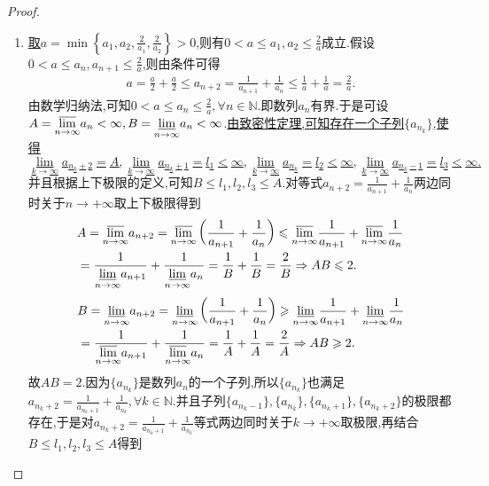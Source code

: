 \documentclass[../../main.tex]{subfiles}%
\begin{document}
\begin{proof}
\begin{enumerate}
\item \hyperref[example3.24(1)]{取\(a=\min \left\{ a_1,a_2,\frac{2}{a_1},\frac{2}{a_2} \right\}>0\)},则有$0<a\leqslant  a_1,a_2\leqslant  \frac{2}{a}$成立.假设$0<a\leqslant  a_n,a_{n+1}\leqslant  \frac{2}{a}$,则由条件可得
\begin{align*}
a=\frac{a}{2}+\frac{a}{2}\leqslant a_{n+2}=\frac{1}{a_{n+1}}+\frac{1}{a_n}\leqslant \frac{1}{a}+\frac{1}{a}=\frac{2}{a}.
\end{align*}
由数学归纳法,可知$0<a\leqslant  a_n\leqslant  \frac{2}{a},\forall n\in\mathbb{N}$.即数列${a_n}$有界.于是可设$A=\underset{n\rightarrow \infty}{{\varlimsup }}a_n<\infty ,B=\underset{n\rightarrow \infty}{{\varliminf }}a_n<\infty$.\hyperref[example3.24(2)]{由致密性定理,可知存在一个子列$\{a_{n_k}\}$,使得$$\lim_{k\rightarrow \infty} a_{n_k+2}=A,\lim_{k\rightarrow \infty} a_{n_k+1}=l_1<\infty,\lim_{k\rightarrow \infty} a_{n_k}=l_2<\infty,\lim_{k\rightarrow \infty} a_{n_k-1}=l_3<\infty.$$}并且根据上下极限的定义,可知$B\leqslant  l_1,l_2,l_3\leqslant  A$.对等式$a_{n + 2} = \frac{1}{a_{n + 1}} + \frac{1}{a_{n}}$两边同时关于$n\to+\infty$取上下极限得到
\begin{align*}
&A=\underset{n\rightarrow \infty}{{\varlimsup }}a_{n+2}=\underset{n\rightarrow \infty}{{\varlimsup }}\left( \frac{1}{a_{n+1}}+\frac{1}{a_n} \right) \leqslant \underset{n\rightarrow \infty}{{\varlimsup }}\frac{1}{a_{n+1}}+\underset{n\rightarrow \infty}{{\varlimsup }}\frac{1}{a_n}
\\
&=\frac{1}{\underset{n\rightarrow \infty}{{\varliminf }}a_{n+1}}+\frac{1}{\underset{n\rightarrow \infty}{{\varliminf }}a_n}=\frac{1}{B}+\frac{1}{B}=\frac{2}{B}\Rightarrow AB\leqslant 2.
\end{align*}
\begin{align*}
&B=\underset{n\rightarrow \infty}{{\varliminf }}a_{n+2}=\underset{n\rightarrow \infty}{{\varliminf }}\left( \frac{1}{a_{n+1}}+\frac{1}{a_n} \right) \geqslant \underset{n\rightarrow \infty}{{\varliminf }}\frac{1}{a_{n+1}}+\underset{n\rightarrow \infty}{{\varliminf }}\frac{1}{a_n}
\\
&=\frac{1}{\underset{n\rightarrow \infty}{{\varlimsup }}a_{n+1}}+\frac{1}{\underset{n\rightarrow \infty}{{\varlimsup }}a_n}=\frac{1}{A}+\frac{1}{A}=\frac{2}{A}\Rightarrow AB\geqslant 2.
\end{align*}
故$AB=2$.因为$\{a_{n_k}\}$是数列${a_n}$的一个子列,所以$\{a_{n_k}\}$也满足$a_{n_k+2}=\frac{1}{a_{n_k+1}}+\frac{1}{a_{n_k}},\forall k\in\mathbb{N}$.并且子列$\{a_{n_k-1}\},\{a_{n_k}\},\{a_{n_k+1}\},\{a_{n_k+2}\}$的极限都存在,于是对$a_{n_k+2}=\frac{1}{a_{n_k+1}}+\frac{1}{a_{n_k}}$等式两边同时关于$k\to+\infty$取极限,再结合$B\leqslant  l_1,l_2,l_3\leqslant  A$得到

\end{enumerate}
\end{proof}
\end{document}
